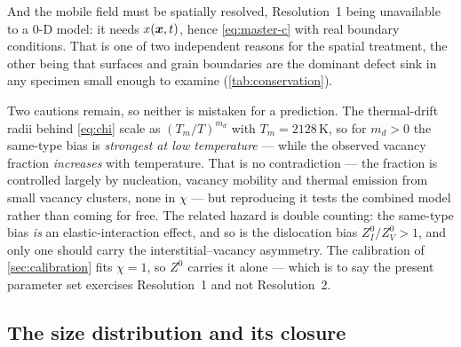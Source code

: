 And the mobile field must be spatially resolved, Resolution~1 being unavailable
to a $0$-D model: it needs $x(\bm{x},t)$, hence \cref{eq:master-c} with real
boundary conditions. That is one of two independent
reasons for the spatial treatment, the other being that surfaces and grain
boundaries are the dominant defect sink in any specimen small enough to examine
(\cref{tab:conservation}).

Two cautions remain, so neither is mistaken for a prediction. The
thermal-drift radii behind \cref{eq:chi} scale as $(T_m/T)^{m_d}$ with
$T_m=2128\,$K, so for $m_d>0$ the same-type bias is \emph{strongest at low
temperature} --- while the observed vacancy \aloop{} fraction \emph{increases}
with temperature. That is no contradiction --- the fraction is controlled
largely by nucleation, vacancy mobility and thermal emission from small vacancy
clusters, none in $\chi$ --- but reproducing it tests the combined model rather
than coming for free. The related hazard is double
counting: the same-type bias \emph{is} an elastic-interaction effect, and so is
the dislocation bias $Z^{0}_{I}/Z^{0}_{V}>1$, and only one should carry the
interstitial--vacancy asymmetry. The calibration of \cref{sec:calibration} fits
$\chi=1$, so $Z^{0}$ carries it alone --- which is to say the present parameter
set exercises Resolution~1 and not Resolution~2.

\subsection{The size distribution and its closure}
\label{sec:moments}

